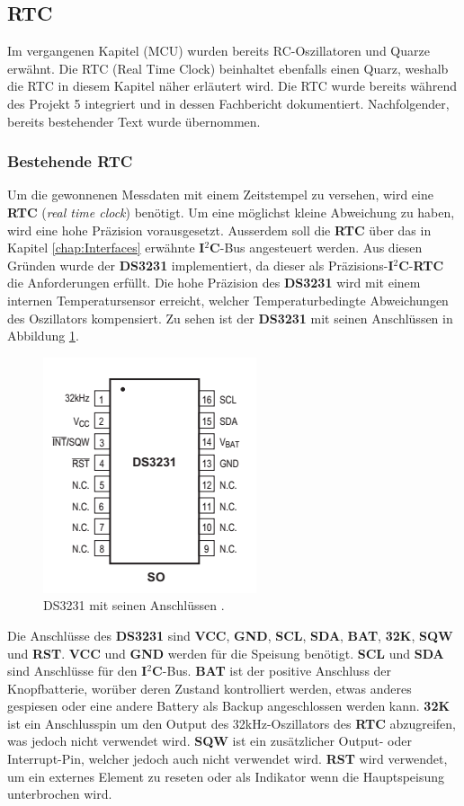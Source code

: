 \subsection{RTC}
\label{subsec:RTC}
Im vergangenen Kapitel (MCU) wurden bereits RC-Oszillatoren und Quarze erwähnt. Die RTC (Real Time Clock) beinhaltet ebenfalls einen Quarz, weshalb die RTC in diesem Kapitel näher erläutert wird.
Die RTC wurde bereits während des Projekt 5 integriert und in dessen Fachbericht dokumentiert. Nachfolgender, bereits bestehender Text wurde übernommen.

\subsubsection{Bestehende RTC}
Um die gewonnenen Messdaten mit einem Zeitstempel zu versehen, wird eine \textbf{RTC} (\textit{real time clock}) benötigt. Um eine möglichst kleine Abweichung zu haben, wird eine hohe Präzision vorausgesetzt. Ausserdem soll die \textbf{RTC} über das in Kapitel \ref{chap:Interfaces} erwähnte \textbf{I$^2$C}-Bus angesteuert werden. Aus diesen Gründen wurde der \textbf{DS3231} implementiert, da dieser als Präzisions-\textbf{I$^2$C}-\textbf{RTC} die Anforderungen erfüllt. Die hohe Präzision des \textbf{DS3231} wird mit einem internen Temperatursensor erreicht, welcher Temperaturbedingte Abweichungen des Oszillators kompensiert. Zu sehen ist der \textbf{DS3231} mit seinen Anschlüssen in Abbildung \ref{fig:DS3231}.

\begin{figure}[h]
\centering
\includegraphics[width=0.4\linewidth]{graphics/DS3231.png}
\caption{DS3231 mit seinen Anschlüssen \cite{DS3231DS}.}
\label{fig:DS3231}
\end{figure}

Die Anschlüsse des \textbf{DS3231} sind \textbf{VCC}, \textbf{GND}, \textbf{SCL}, \textbf{SDA}, \textbf{BAT}, \textbf{32K}, \textbf{SQW} und \textbf{RST}. \textbf{VCC} und \textbf{GND} werden für die Speisung benötigt. \textbf{SCL} und \textbf{SDA} sind Anschlüsse für den \textbf{I$^2$C}-Bus. \textbf{BAT} ist der positive Anschluss der Knopfbatterie, worüber deren Zustand kontrolliert werden, etwas anderes gespiesen oder eine andere Battery als Backup angeschlossen werden kann. \textbf{32K} ist ein Anschlusspin um den Output des 32kHz-Oszillators des \textbf{RTC} abzugreifen, was jedoch nicht verwendet wird. \textbf{SQW} ist ein zusätzlicher Output- oder Interrupt-Pin, welcher jedoch auch nicht verwendet wird. \textbf{RST} wird verwendet, um ein externes Element zu reseten oder als Indikator wenn die Hauptspeisung unterbrochen wird. \cite{DS3231DS}\\

